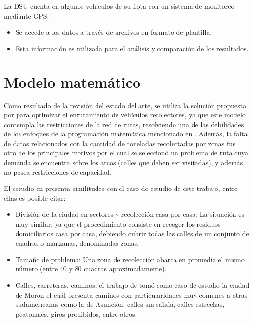 La DSU cuenta en algunos vehículos de su flota con un sistema de monitoreo mediante GPS: 

\begin{itemize}
    \item Se accede a los datos a través de archivos en formato de plantilla.
    \item Esta información es utilizada para el análisis y comparación de los resultados.
\end{itemize}

\section{Modelo matemático}

Como resultado de la revisión del estado del arte, se utiliza la solución propuesta por \citet{Braier2017AnArgentina} para optimizar el enrutamiento de vehículos recolectores, ya que este modelo contempla las restricciones de la red de rutas, resolviendo una de las debilidades de los enfoques de la programación matemática mencionado en \cite{Sulemana2018OptimalMethods}. Además, la falta de datos relacionados con la cantidad de toneladas recolectadas por zonas fue otro de los principales motivos por el cual se seleccionó un problema de ruta cuya demanda se encuentra sobre los arcos (calles que deben ser visitadas), y además no posea restricciones de capacidad.

El estudio en \cite{Braier2017AnArgentina} presenta similitudes con el caso de estudio de este trabajo, entre ellas es posible citar:

\begin{itemize}
    \item División de la ciudad en sectores y recolección casa por casa: La situación es muy similar, ya que el procedimiento consiste en recoger los residuos domiciliarios casa por casa, debiendo cubrir todas las calles de un conjunto de cuadras o manzanas, denominadas zonas.
    \item Tamaño de problema: Una zona de recolección abarca en promedio el mismo número (entre 40 y 80 cuadras aproximadamente).
    \item Calles, carreteras, caminos: el trabajo de \citet{Braier2017AnArgentina} tomó como caso de estudio la ciudad de Morón el cuál presenta caminos con particularidades muy comunes a otras sudamericanas como la de Asunción: calles sin salida, calles estrechas, peatonales, giros prohibidos, entre otros.
\end{itemize}

